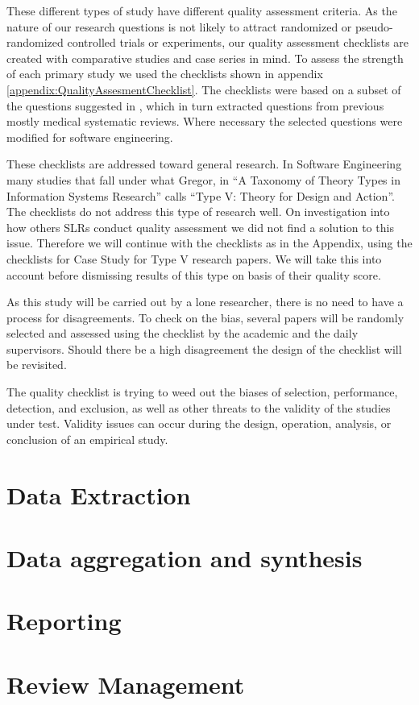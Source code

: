 These different types of study have different quality assessment criteria.  
As the nature of our research questions is not likely to attract randomized or pseudo-randomized controlled trials or experiments, our quality assessment checklists are created with comparative studies and case series in mind.
To assess the strength of each primary study we used the checklists shown in appendix \ref{appendix:QualityAssesmentChecklist}.
The checklists were based on a subset of the questions suggested in \cite{keele2007guidelines}, which in turn extracted questions from previous mostly medical systematic reviews.
Where necessary the selected questions were modified for software engineering.

These checklists are addressed toward general research.
In Software Engineering many studies that fall under what Gregor\cite{gregor2006nature}, in ``A Taxonomy of Theory Types in Information Systems Research'' calls ``Type V: Theory for Design and Action''.
The checklists do not address this type of research well.
On investigation into how others SLRs conduct quality assessment we did not find a solution to this issue. 
Therefore we will continue with the checklists as in the Appendix, using the checklists for Case Study for Type V research papers.
We will take this into account before dismissing results of this type on basis of their quality score.

As this study will be carried out by a lone researcher, there is no need to have a process for disagreements.
To check on the bias, several papers will be randomly selected and assessed using the checklist by the academic and the daily supervisors.
Should there be a high disagreement the design of the checklist will be revisited.

The quality checklist is trying to weed out the biases of selection, performance, detection, and exclusion, as well as other threats to the validity of the studies under test.
Validity issues can occur during the design, operation, analysis, or conclusion of an empirical study.

\section{Data Extraction}

\section{Data aggregation and synthesis}

\section{Reporting}

\section{Review Management}
